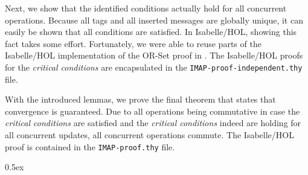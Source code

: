 \documentclass[11pt,a4paper, DIV=11]{article}
\begin{document}
Next, we show that the identified conditions actually hold for all concurrent
operations. Because all tags and all inserted messages are globally unique, it can
easily be shown that all conditions are satisfied. In Isabelle/HOL, showing this fact
takes some effort. Fortunately, we were able to reuse parts of the Isabelle/HOL implementation
of the OR-Set proof in \cite{gomes_crdtafp}. The Isabelle/HOL proofs for the
\textit{critical conditions} are encapsulated in the \texttt{IMAP-proof-independent.thy} file.

With the introduced lemmas, we prove the final theorem that states that convergence
is guaranteed. Due to all operations being commutative in case the \textit{critical conditions}
are satisfied and the \textit{critical conditions} indeed are holding for all concurrent updates,
all concurrent operations commute. The Isabelle/HOL proof is contained in the
\texttt{IMAP-proof.thy} file.

\parindent 0pt\parskip 0.5ex





\end{document}
